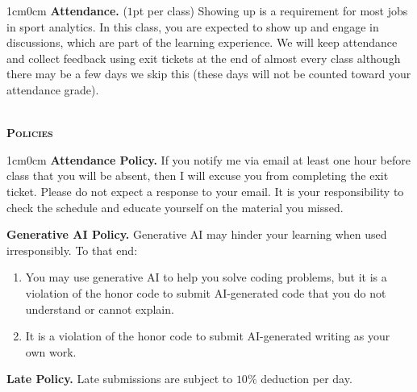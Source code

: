 \documentclass[11pt]{article}
\begin{document}
\begin{adjustwidth}{1cm}{0cm}
  \textbf{Attendance.} ($1$pt per class) Showing up is a requirement for most jobs in sport analytics. In this class, you are expected to show up and engage in discussions, which are part of the learning experience. We will keep attendance and collect feedback using exit tickets at the end of almost every class although there may be a few days we skip this (these days will not be counted toward your attendance grade).
\end{adjustwidth}

~\\
\textbf{\textsc{Policies}}
\begin{adjustwidth}{1cm}{0cm}
  \textbf{Attendance Policy.} If you notify me via email at least one hour before class that you will be absent, then I will excuse you from completing the exit ticket. Please do not expect a response to your email. It is your responsibility to check the schedule and educate yourself on the material you missed.

  \textbf{Generative AI Policy.} Generative AI may hinder your learning when used irresponsibly. To that end:
  \begin{enumerate}
    \item You may use generative AI to help you solve coding problems, but it is a violation of the honor code to submit AI-generated code that you do not understand or cannot explain.
    \item It is a violation of the honor code to submit AI-generated writing as your own work.
  \end{enumerate}

  \textbf{Late Policy.} Late submissions are subject to $10\%$ deduction per day.
\end{adjustwidth}
\end{document}
